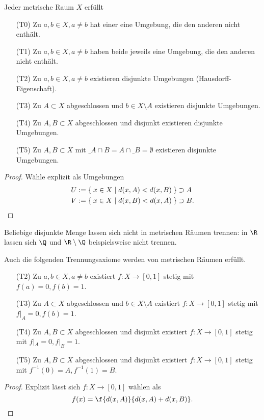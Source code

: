 Jeder metrische Raum $X$ erfüllt
\begin{enumerate}[1)]
	\item[(T0)]
		Zu $a, b \in X, a \neq b$ hat einer eine Umgebung, die den anderen nicht enthält.
	\item[(T1)]
		Zu $a, b \in X, a \neq b$ haben beide jeweils eine Umgebung, die den anderen nicht enthält.
	\item[(T2)]
		Zu $a, b \in X, a \neq b$ existieren disjunkte Umgebungen (Hausdorff-Eigenschaft).
	\item[(T3)]
		Zu $A \subset X$ abgeschlossen und $b \in X \setminus A$ existieren disjunkte Umgebungen.
	\item[(T4)]
		Zu $A, B \subset X$ abgeschlossen und disjunkt existieren disjunkte Umgebungen.
	\item[(T5)]
		Zu $A, B \subset X$ mit $\_A \cap B = A \cap \_B = \emptyset$ existieren disjunkte Umgebungen.
\end{enumerate}
\begin{proof}
	Wähle explizit als Umgebungen
	\begin{align*}
		U &:= \Set{ x \in X | d(x, A) < d(x, B) } \supset A \\
		V &:= \Set{ x \in X | d(x, B) < d(x, A) } \supset B.
	\end{align*}
\end{proof}
Beliebige disjunkte Menge lassen sich nicht in metrischen Räumen trennen:
in $\R$ lassen sich $\Q$ und $\R \setminus \Q$ beispielsweise nicht trennen.

Auch die folgenden Trennungsaxiome werden von metrischen Räumen erfüllt.
\begin{enumerate}
	\item[(T2\sfrac 12)]
		Zu $a, b \in X, a \neq b$ existiert $f: X \to [0,1]$ stetig mit $f(a) = 0, f(b) = 1$.
	\item[(T3\sfrac 12)]
		Zu $A \subset X$ abgeschlossen und $b \in X \setminus A$ existiert $f: X \to [0,1]$ stetig mit $f|_A = 0, f(b) = 1$.
	\item[(T4\sfrac 12)]
		Zu $A, B \subset X$ abgeschlossen und disjunkt existiert $f: X \to [0,1]$ stetig mit $f|_A = 0, f|_B = 1$.
	\item[(T5\sfrac 12)]
		Zu $A, B \subset X$ abgeschlossen und disjunkt existiert $f: X \to [0,1]$ stetig mit $f^{-1}(0) = A, f^{-1}(1) = B$.
\end{enumerate}
\begin{proof}
	Explizit lässt sich $f: X \to [0,1]$ wählen als
	\[
		f(x)
		= \f {d(x,A)}{d(x,A) + d(x,B)}.
	\]
\end{proof}

